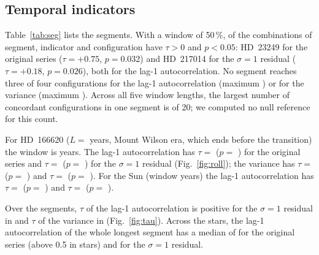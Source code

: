 \subsection{Temporal indicators}
\label{sec:temporal}

\begin{table}[p]
\centering\small

\caption{Segments with an indicator. $L$: length in years; Interp.: interpolated years; $\tau$ and $p$: Kendall $\tau$ of the rolling lag-1 autocorrelation (window 50\,\%) and its surrogate $p$, for the original series and for the $\sigma = 1$ year residual; Conc.: number of the four configurations with $\tau > 0$ and $p < 0.05$, for the lag-1 autocorrelation and for the variance (the other two configurations are not shown). $^{a}$ $B\!-\!V$ outside 0.44--0.82. $^{b}$ Composite of several instruments; exploratory.}
\label{tab:seg}
\end{table}

Table~\ref{tab:seg} lists the \NSegments{} segments. With a window of 50\,\%, \NSigHalf{} of the \NCellsHalf{} combinations of segment, indicator and configuration have $\tau > 0$ and $p < 0.05$: HD~23249 for the original series ($\tau = +0.75$, $p = 0.032$) and HD~217014 for the $\sigma = 1$ residual ($\tau = +0.18$, $p = 0.026$), both for the lag-1 autocorrelation. No segment reaches three of four configurations for the lag-1 autocorrelation (maximum \MaxConcAR) or for the variance (maximum \MaxConcVar). Across all five window lengths, the largest number of concordant configurations in one segment is \MaxConcSweep{} of 20; we computed no null reference for this count.

For HD~166620 ($L = $ \HDHL{} years, Mount Wilson era, which ends before the transition) the window is \WinHD{} years. The lag-1 autocorrelation has $\tau = $ \HDHTauNone{} ($p = $ \HDHPNone) for the original series and $\tau = $ \HDHTauSOne{} ($p = $ \HDHPSOne) for the $\sigma = 1$ residual (Fig.~\ref{fig:roll}); the variance has $\tau = $ \HDHVarTauNone{} ($p = $ \HDHVarPNone) and $\tau = $ \HDHVarTauSOne{} ($p = $ \HDHVarPSOne). For the Sun (window \WinSun{} years) the lag-1 autocorrelation has $\tau = $ \SunTauNone{} ($p = $ \SunPNone) and $\tau = $ \SunTauSOne{} ($p = $ \SunPSOne).

Over the \NSegments{} segments, $\tau$ of the lag-1 autocorrelation is positive for the $\sigma = 1$ residual in \NTauPosARSOne{} and $\tau$ of the variance in \NTauPosVarSOne{} (Fig.~\ref{fig:tau}). Across the \NStarsMetric{} stars, the lag-1 autocorrelation of the whole longest segment has a median of \MedACNone{} for the original series (above 0.5 in \NACNoneHigh{} stars) and \MedACSOne{} for the $\sigma = 1$ residual.

